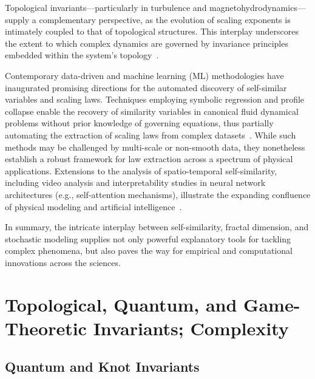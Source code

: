 \documentclass[sigconf]{acmart}
\begin{document}
Topological invariants—particularly in turbulence and magnetohydrodynamics—supply a complementary perspective, as the evolution of scaling exponents is intimately coupled to that of topological structures. This interplay underscores the extent to which complex dynamics are governed by invariance principles embedded within the system's topology~\cite{ref60}.

Contemporary data-driven and machine learning (ML) methodologies have inaugurated promising directions for the automated discovery of self-similar variables and scaling laws. Techniques employing symbolic regression and profile collapse enable the recovery of similarity variables in canonical fluid dynamical problems without prior knowledge of governing equations, thus partially automating the extraction of scaling laws from complex datasets~\cite{ref65}. While such methods may be challenged by multi-scale or non-smooth data, they nonetheless establish a robust framework for law extraction across a spectrum of physical applications. Extensions to the analysis of spatio-temporal self-similarity, including video analysis and interpretability studies in neural network architectures (e.g., self-attention mechanisms), illustrate the expanding confluence of physical modeling and artificial intelligence~\cite{ref39}.

\vspace{1em}

In summary, the intricate interplay between self-similarity, fractal dimension, and stochastic modeling supplies not only powerful explanatory tools for tackling complex phenomena, but also paves the way for empirical and computational innovations across the sciences.

\section{Topological, Quantum, and Game-Theoretic Invariants; Complexity}

\subsection{Quantum and Knot Invariants}
\end{document}
